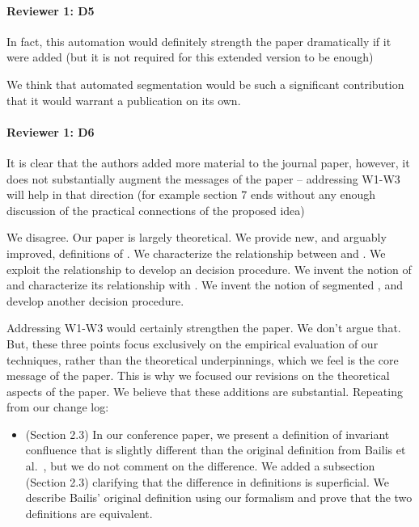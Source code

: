 \documentclass[9pt]{article}
\begin{document}
\begin{multicols*}{2}
\paragraph{Reviewer 1: D5}
\begin{feedback}
  In fact, this automation would definitely strength the paper dramatically if
  it were added (but it is not required for this extended version to be enough)
\end{feedback}
We think that automated segmentation would be such a significant contribution
that it would warrant a publication on its own.

\paragraph{Reviewer 1: D6}
\begin{feedback}
  It is clear that the authors added more material to the journal paper,
  however, it does not substantially augment the messages of the paper --
  addressing W1-W3 will help in that direction (for example section 7 ends
  without any enough discussion of the practical connections of the proposed
  idea)
\end{feedback}
We disagree. Our paper is largely theoretical. We provide new, and arguably
improved, definitions of \invariantconfluence{}. We characterize the
relationship between \invariantclosure{} and \invariantconfluence{}. We exploit
the relationship to develop an \invariantclosure{} decision procedure. We
invent the notion of \mergereducibility{} and characterize its relationship
with \invariantclosure{}. We invent the notion of segmented
\invariantconfluence{}, and develop another decision procedure.

Addressing W1-W3 would certainly strengthen the paper. We don't argue that.
But, these three points focus exclusively on the empirical evaluation of our
techniques, rather than the theoretical underpinnings, which we feel is the
core message of the paper. This is why we focused our revisions on the
theoretical aspects of the paper. We believe that these additions are
substantial. Repeating from our change log:
\begin{itemize}
  \item (Section 2.3)
    In our conference paper, we present a definition of invariant confluence
    that is slightly different than the original definition from Bailis et
    al.~\cite{bailis2014coordination}, but we do not comment on the difference.
    We added a subsection (Section 2.3) clarifying that the difference in
    definitions is superficial. We describe Bailis' original definition using
    our formalism and prove that the two definitions are equivalent.


\end{itemize}
\end{multicols*}
\end{document}
